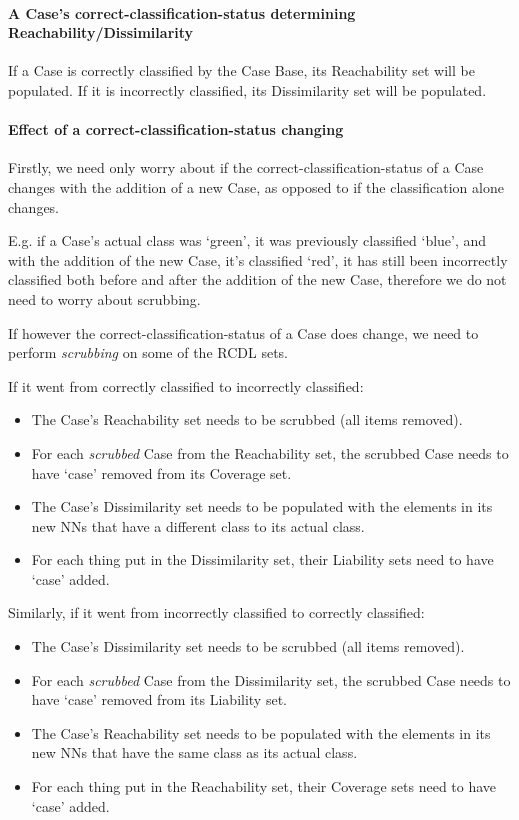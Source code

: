 \documentclass[a4paper,11pt]{report}
\begin{document}
\paragraph{A Case's correct-classification-status determining Reachability/Dissimilarity}
If a Case is correctly classified by the Case Base, its Reachability set will be populated. If it is incorrectly classified, its Dissimilarity set will be populated.
 
\paragraph{Effect of a correct-classification-status changing}
Firstly, we need only worry about if the correct-classification-status of a Case changes with the addition of a new Case, as opposed to if the classification alone changes.

E.g. if a Case's actual class was `green', it was previously classified `blue', and with the addition of the new Case, it's classified `red', it has still been incorrectly classified both before and after the addition of the new Case, therefore we do not need to worry about scrubbing.

If however the correct-classification-status of a Case does change, we need to perform \emph{scrubbing} on some of the RCDL sets.

If it went from correctly classified to incorrectly classified:
\begin{itemize}
	\item The Case's Reachability set needs to be scrubbed (all items removed).
	\item For each \emph{scrubbed} Case from the Reachability set, the scrubbed Case needs to have `case' removed from its Coverage set.
	\item The Case's Dissimilarity set needs to be populated with the elements in its new NNs that have a different class to its actual class.
	\item For each thing put in the Dissimilarity set, their Liability sets need to have `case' added.
\end{itemize}

Similarly, if it went from incorrectly classified to correctly classified:
\begin{itemize}
	\item The Case's Dissimilarity set needs to be scrubbed (all items removed).
	\item For each \emph{scrubbed} Case from the Dissimilarity set, the scrubbed Case needs to have `case' removed from its Liability set.
	\item The Case's Reachability set needs to be populated with the elements in its new NNs that have the same class as its actual class.
	\item For each thing put in the Reachability set, their Coverage sets need to have `case' added.
\end{itemize}
\end{document}

